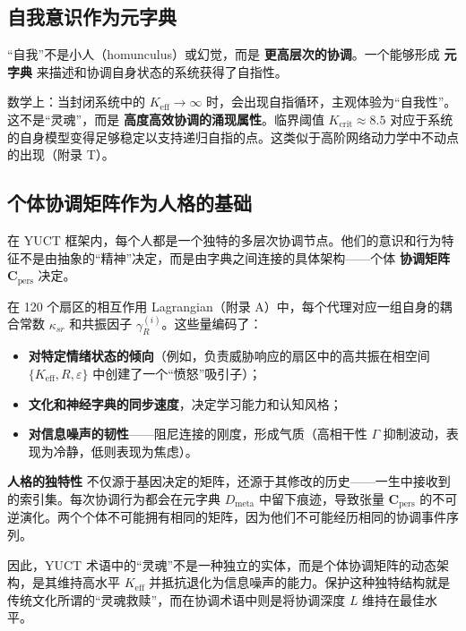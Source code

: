 \documentclass[12pt,a4paper]{article}
\newcommand{\eff}{\mathrm{eff}}
\newcommand{\Ke}{K_{\eff}}
\newcommand{\Kcrit}{K_{\mathrm{crit}}}
\begin{document}
	\subsection{自我意识作为元字典}
	
	“自我”不是小人（homunculus）或幻觉，而是 \textbf{更高层次的协调}。一个能够形成 \textbf{元字典} 来描述和协调自身状态的系统获得了自指性。
	
	数学上：当封闭系统中的 $\Ke \to \infty$ 时，会出现自指循环，主观体验为“自我性”。这不是“灵魂”，而是 \textbf{高度高效协调的涌现属性}。临界阈值 $\Kcrit \approx 8.5$ 对应于系统的自身模型变得足够稳定以支持递归自指的点。这类似于高阶网络动力学中不动点的出现（附录 T）。
	
	\subsection{个体协调矩阵作为人格的基础}
	\label{subsec:personality-matrix}
	
	在 YUCT 框架内，每个人都是一个独特的多层次协调节点。他们的意识和行为特征不是由抽象的“精神”决定，而是由字典之间连接的具体架构——个体 \textbf{协调矩阵} $\mathbf{C}_{\text{pers}}$ 决定。
	
	在 120 个扇区的相互作用 Lagrangian（附录 A）中，每个代理对应一组自身的耦合常数 $\kappa_{sr}$ 和共振因子 $\gamma_{R}^{(i)}$。这些量编码了：
	\begin{itemize}
		\item \textbf{对特定情绪状态的倾向}（例如，负责威胁响应的扇区中的高共振在相空间 $\{K_{\mathrm{eff}}, R, \varepsilon\}$ 中创建了一个“愤怒”吸引子）；
		\item \textbf{文化和神经字典的同步速度}，决定学习能力和认知风格；
		\item \textbf{对信息噪声的韧性}——阻尼连接的刚度，形成气质（高相干性 $\Gamma$ 抑制波动，表现为冷静，低则表现为焦虑）。
	\end{itemize}
	
	\textbf{人格的独特性} 不仅源于基因决定的矩阵，还源于其修改的历史——一生中接收到的索引集。每次协调行为都会在元字典 $D_{\text{meta}}$ 中留下痕迹，导致张量 $\mathbf{C}_{\text{pers}}$ 的不可逆演化。两个个体不可能拥有相同的矩阵，因为他们不可能经历相同的协调事件序列。
	
	因此，YUCT 术语中的“灵魂”不是一种独立的实体，而是个体协调矩阵的动态架构，是其维持高水平 $K_{\mathrm{eff}}$ 并抵抗退化为信息噪声的能力。保护这种独特结构就是传统文化所谓的“灵魂救赎”，而在协调术语中则是将协调深度 $L$ 维持在最佳水平。
	
\end{document}
